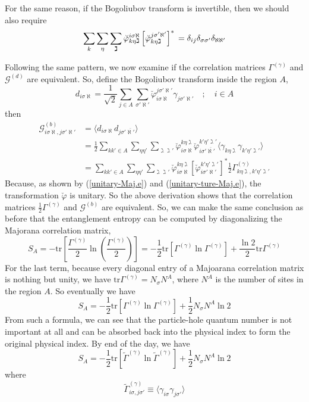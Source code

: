 \documentclass[12font]{article}
\theoremstyle{definition}
\numberwithin{equation}{section}
\newcommand{\anglelr}[1]{\langle #1 \rangle}
\newcommand{\lr}[1]{\left(  #1  \right)}
\newcommand{\lrm}[1]{\left[  #1  \right]}
\newcommand{\mrm}[1]{\mathrm{#1}}
\newcommand{\tr}{\mrm{tr}}
\begin{document}
For the same reason, if the Bogoliubov transform is invertible, then we should also require
\begin{equation}\label{unitary-ture-Maj.e}
  \sum_{k}\sum_{\eta}\sum_{\gimel} \breve{\varphi}_{k\eta\gimel}^{i\sigma\aleph} \lrm{\breve{\varphi}_{k\eta\gimel}^{j\sigma'\aleph'}}^*\\
    =\delta_{ij}\delta_{\sigma\sigma'}\delta_{\aleph\aleph'}
\end{equation}

Following the same pattern, we now examine if the correlation matrices $\Gamma^{(\gamma)}$ and $\mathcal{G}^{(d)}$ are equivalent. So, define the Bogoliubov transform inside the region $A$,
\[
d_{i\sigma\aleph} = \frac{1}{\sqrt{2}}\sum_{j\in A}\sum_{\sigma'\aleph'} \breve{\varphi}^{j\sigma'\aleph'}_{i\sigma\aleph}\gamma_{j\sigma'\aleph'} \quad;\quad i\in A
\]
then
\begin{align*}
  \mathcal{G}^{(b)}_{i\sigma\aleph,j\sigma'\aleph'} 
  &= 
  \anglelr{ d_{i\sigma\aleph}d_{j\sigma'\overline{\aleph'}} } \\
  &= \frac{1}{2}\sum_{kk'\in A}\sum_{\eta\eta'}\sum_{\gimel\gimel'} \breve{\varphi}_{i\sigma\aleph}^{k\eta\gimel} \breve{\varphi}_{i\sigma'\overline{\aleph'}}^{k'\eta'\gimel'} \anglelr{\gamma_{k\eta\gimel}\gamma_{k'\eta'\gimel'}} \\
  &=
  \sum_{kk'\in A}\sum_{\eta\eta'}\sum_{\gimel\gimel'} \breve{\varphi}_{i\sigma\aleph}^{k\eta\gimel}
  \lrm{\breve{\varphi}_{i\sigma'\aleph'}^{k'\eta'\gimel'}}^* \frac{1}{2}\Gamma^{(\gamma)}_{k\eta\gimel,k'\eta'\gimel'}
\end{align*}
Because, as shown by (\ref{unitary-Maj.e}) and (\ref{unitary-ture-Maj.e}), the transformation $\breve{\varphi}$ is unitary. So the above derivation shows that the correlation matrices $\frac{1}{2}\Gamma^{(\gamma)}$ and $\mathcal{G}^{(b)}$ are equivalent. So, we can make the same conclusion as before that the entanglement entropy can be computed by diagonalizing the Majorana correlation matrix,
\[
S_A = -\tr\lrm{\frac{\Gamma^{(\gamma)}}{2}\ln \lr{\frac{\Gamma^{(\gamma)}}{2}}} = -\frac{1}{2}\tr\lrm{\Gamma^{(\gamma)}\ln\Gamma^{(\gamma)}} + \frac{\ln 2}{2}\tr\Gamma^{(\gamma)}
\]
For the last term, because every diagonal entry of a Majoarana correlation matrix is nothing but unity, we have $\tr\Gamma^{(\gamma)} = N_{\sigma} N^A$, where $N^A$ is the number of sites in the region $A$. So eventually we have
\[
    S_A = -\frac{1}{2}\tr\lrm{\Gamma^{(\gamma)}\ln\Gamma^{(\gamma)}} + \frac{1}{2}N_{\sigma}N^A\ln 2
\]
From such a formula, we can see that the particle-hole quantum number is not important at all and can be absorbed back into the physical index to form the original physical index. By end of the day, we have
\begin{equation}\label{ee-corr-Maj.e}
  S_A = -\frac{1}{2}\tr\lrm{\tilde{\Gamma}^{(\gamma)}\ln\tilde{\Gamma}^{(\gamma)}} + \frac{1}{2}N_{\sigma}N^A\ln 2
\end{equation}
where
\begin{equation}\label{original-correlation.e}
  \tilde{\Gamma}^{(\gamma)}_{i\sigma,j\sigma'} \equiv \anglelr{\gamma_{i\sigma}\gamma_{j\sigma'}}
\end{equation}
\end{document}
